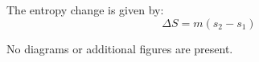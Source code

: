 The entropy change is given by:  
\[
\Delta S = m \left( s_2 - s_1 \right)
\]  

No diagrams or additional figures are present.